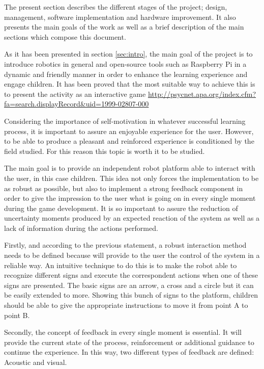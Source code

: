 The present section describes the different stages of the project; design, management, software implementation and hardware improvement. It also presents the main goals of the work as well as a brief description of the main sections which compose this document.

As it has been presented in section \ref{sec:intro}, the main goal of the project is to introduce robotics in general and open-source tools such as Raspberry Pi in a dynamic and friendly manner in order to enhance the learning experience and engage children. It has been proved that the most suitable way to achieve this is to present the activity as an interactive game \url{ http://psycnet.apa.org/index.cfm?fa=search.displayRecord&uid=1999-02807-000}

Considering the importance of self-motivation in whatever successful learning process, it is important to assure an enjoyable experience for the user. However, to be able to produce a pleasant and reinforced experience is conditioned by the field studied. For this reason this topic is worth it to be studied.

The main goal is to provide an independent robot platform able to interact with the user, in this case children. This idea not only forces the implementation to be as robust as possible, but also to implement a strong feedback component in order to give the impression to the user what is going on in every single moment during the game development. It is so important to assure the reduction of uncertainty moments produced by an expected reaction of the system as well as a lack of information during the actions performed. 

Firstly, and according to the previous statement, a robust interaction method needs to be defined because will provide to the user the control of the system in a reliable way. An intuitive technique to do this is to make the robot able to recognize different signs and execute the correspondent actions when one of these signs are presented. The basic signs are an arrow, a cross and a circle but it can be easily extended to more. Showing this bunch of signs to the platform, children should be able to give the appropriate instructions to move it from point A to point B.

Secondly, the concept of feedback in every single moment is essential. It will provide the current state of the process, reinforcement or additional guidance to continue the experience. In this way, two different types of feedback are defined: Acoustic and visual. 

